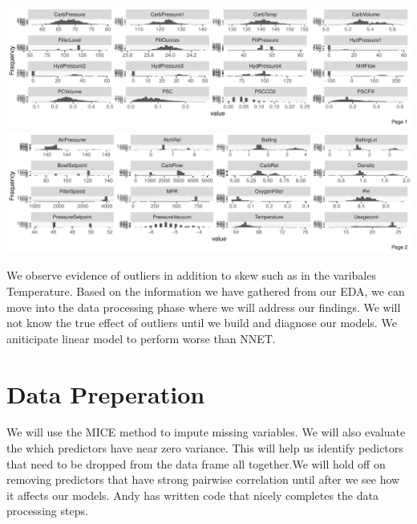 \documentclass[]{report}
\begin{document}
\includegraphics{Project2-VH_files/figure-latex/project2a4-1.pdf}
\includegraphics{Project2-VH_files/figure-latex/project2a4-2.pdf}

We observe evidence of outliers in addition to skew such as in the
varibales Temperature. Based on the information we have gathered from
our EDA, we can move into the data processing phase where we will
address our findings. We will not know the true effect of outliers until
we build and diagnose our models. We aniticipate linear model to perform
worse than NNET.

\newpage

\hypertarget{data-preperation}{%
\section{Data Preperation}\label{data-preperation}}

We will use the MICE method to impute missing variables. We will also
evaluate the which predictors have near zero variance. This will help us
identify pedictors that need to be dropped from the data frame all
together.We will hold off on removing predictors that have strong
pairwise correlation until after we see how it affects our models. Andy
has written code that nicely completes the data processing steps.
\end{document}
